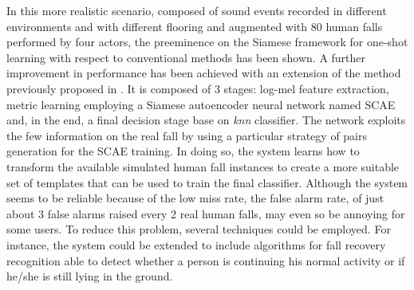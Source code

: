  In this more realistic scenario, composed of sound events recorded in different environments and with different flooring and augmented with 80 human falls performed by four actors, the preeminence on the Siamese framework for one-shot learning with respect to conventional methods has been shown. A further improvement in performance has been achieved with an extension of the method previously proposed in . It is composed of 3 stages: log-mel feature extraction, metric learning employing a Siamese autoencoder neural network named SCAE and, in the end, a final decision stage base on \textit{knn} classifier. The network exploits the few information on the real fall by using a particular strategy of pairs generation for the SCAE training. In doing so, the system learns how to transform the available simulated human fall instances to create a more suitable set of templates that can be used to train the final classifier. 
Although the system seems to be reliable because of the low miss rate, the false alarm rate, of just about 3 false alarms raised every 2 real human falls, may even so be annoying for some users. To reduce this problem, several techniques could be employed. For instance, the system could be extended to include algorithms for fall recovery recognition able to detect whether a person is continuing his normal activity or if he/she is still lying in the ground.
